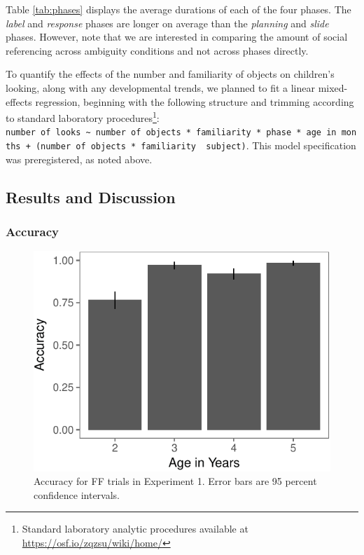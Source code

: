 \documentclass[a4paper,man,apacite,floatsintext]{apa6}
\newenvironment{CodeChunk}{}{}
\begin{document}
Table \ref{tab:phases} displays the average durations of each of the
four phases. The \emph{label} and \emph{response} phases are longer on
average than the \emph{planning} and \emph{slide} phases. However, note
that we are interested in comparing the amount of social referencing
across ambiguity conditions and not across phases directly.

To quantify the effects of the number and familiarity of objects on
children's looking, along with any developmental trends, we planned to
fit a linear mixed-effects regression, beginning with the following
structure and trimming according to standard laboratory
procedures\footnote{Standard laboratory analytic procedures available at
  \url{https://osf.io/zqzsu/wiki/home/}}:
\texttt{number\ of\ looks\ \textasciitilde{}\ number\ of\ objects\ *\ familiarity\ *\ phase\ *\ age\ in\ months\ +\ (number\ of\ objects\ *\ familiarity\ \textbar{}\ subject)}.
This model specification was preregistered, as noted above.

\subsection{Results and Discussion}\label{results-and-discussion}

\subsubsection{Accuracy}\label{accuracy}

\begin{CodeChunk}
\begin{figure}[b]

{\centering \includegraphics{figs/acc_e1-1} 

}

\caption[Accuracy for FF trials in Experiment 1]{Accuracy for FF trials in Experiment 1. Error bars are 95 percent confidence intervals.}\label{fig:acc_e1}
\end{figure}
\end{CodeChunk}
\end{document}
